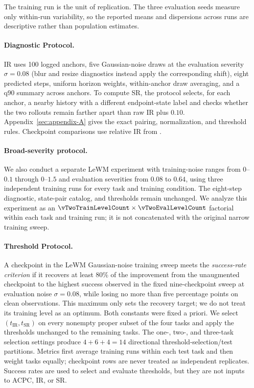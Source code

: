 \documentclass[10pt]{article}
\begin{document}
The training run is the unit of replication. The three evaluation seeds
measure only within-run variability, so the reported means and dispersions
across runs are descriptive rather than population estimates.

\paragraph{Diagnostic Protocol.}
IR uses 100 logged anchors, five Gaussian-noise draws at the
evaluation severity $\sigma=0.08$ (blur and resize diagnostics instead apply
the corresponding shift), eight predicted steps,
uniform horizon weights, within-anchor draw averaging, and a q90 summary
across anchors. To compute SR, the protocol selects, for each anchor, a nearby
history with a different endpoint-state label and checks whether the two
rollouts remain farther apart than raw IR plus $0.10$.
Appendix~\ref{sec:appendix-A} gives the exact pairing,
normalization, and threshold rules. Checkpoint comparisons use relative IR
from .

\paragraph{Broad-severity protocol.}
We also conduct a separate LeWM experiment with
\vTwoTrainLevelCount{} training-noise ranges from $0$--$0.1$ through
$0$--$1.5$ and \vTwoEvalLevelCount{} evaluation severities from $0.08$ to
$0.64$, using three independent training runs for every task and training
condition. The eight-step diagnostic, state-pair catalog, and thresholds remain
unchanged. We analyze this experiment as an
$\vTwoTrainLevelCount\times\vTwoEvalLevelCount$ factorial within each task and
training run; it is not concatenated with the original narrow training sweep.

\paragraph{Threshold Protocol.}
A checkpoint in the LeWM Gaussian-noise training sweep meets the
\emph{success-rate criterion} if it
recovers at least 80\% of the improvement from the unaugmented checkpoint to
the highest success observed in the fixed nine-checkpoint sweep at evaluation
noise $\sigma=0.08$, while losing no more than five percentage points on clean
observations. This maximum only sets the recovery target; we do not treat its
training level as an optimum. Both constants were fixed a priori. We select
$(t_{\mathrm{IR}},t_{\mathrm{SR}})$ on every nonempty proper
subset of the four tasks and apply the thresholds unchanged to the remaining tasks. The one-,
two-, and three-task selection settings produce $4+6+4=14$ directional
threshold-selection/test partitions. Metrics first average training runs
within each test task and then weight tasks equally; checkpoint rows are never
treated as independent replicates. Success rates are used to select and
evaluate thresholds, but they are not inputs to ACPC, IR, or SR.
\end{document}

